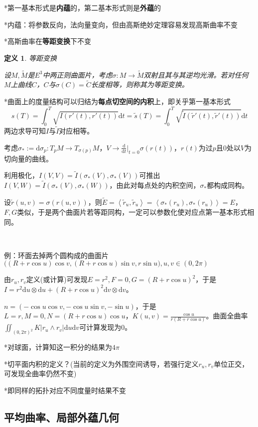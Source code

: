 \documentclass[a4paper,UTF8,fontset=windows]{ctexart}
\newtheorem{dfn}[thm]{定义}
\begin{document}
*第一基本形式是\textbf{内蕴}的，第二基本形式则是\textbf{外蕴}的

*内蕴：将参数反向，法向量变向，但由高斯绝妙定理容易发现高斯曲率不变

*高斯曲率在\textbf{等距变换}下不变

\begin{dfn} 等距变换

设$M,\tilde{M}$是$E^3$中两正则曲面片，考虑$\sigma:M\to\tilde{M}$双射且其与其逆均光滑。若对任何$M$上曲线$C$，$C$与$\sigma(C)=\tilde{C}$长度相等，则称其为等距变换。
\end{dfn}

*曲面上的度量结构可以归结为\textbf{每点切空间的内积}上，即关乎第一基本形式
$$s(T)=\int_0^T\sqrt{I(r'(t),r'(t))}\mathrm{d}t=\tilde{s}(T)=\int_0^T\sqrt{\tilde{I}(\tilde{r}'(t),\tilde{r}'(t))}\mathrm{d}t$$
两边求导可知$I$与$\tilde{I}$对应相等。

考虑$\sigma_*:=\mathrm{d}\sigma_p:T_pM\to T_{\sigma(p)}M$，$V\to \frac{\mathrm{d}}{\mathrm{d}t}\big|_{t=0}\sigma(r(t))$，$r(t)$为过$p$且0处以$V$为切向量的曲线。

利用极化，$I(V,V)=\tilde{I}(\sigma_*(V),\sigma_*(V))$可推出$I(V,W)=\tilde{I}(\sigma_*(V),\sigma_*(W))$，由此对每点处的内积空间，$\sigma_*$都构成同构。

设$\tilde{r}(u,v)=\sigma(r(u,v))$，则$\tilde{E}=\left<\tilde{r}_u,\tilde{r}_u\right>=\left<\sigma_*(r_u),\sigma_*(r_u)\right>=E$，$F,G$类似，于是两个曲面片若等距同构，一定可以参数化使对应点第一基本形式相同。

\

例：环面去掉两个圆构成的曲面片$\big((R+r\cos u)\cos v,(R+r\cos u)\sin v,r\sin u\big),u,v\in(0,2\pi)$

由$r_u,r_v$定义(或计算)可发现$E=r^2,F=0,G=(R+r\cos u)^2$，于是$I=r^2\mathrm{d}u\otimes\mathrm{d}u+(R+r\cos u)^2\mathrm{d}v\otimes\mathrm{d}v$。

$n=(-\cos u\cos v,-\cos u\sin v, -\sin u)$，于是$L=r,M=0,N=(R+r\cos u)\cos u$，$K(u,v)=\frac{\cos u}{r(R+r\cos u)}$。曲面全曲率$\iint_{(0,2\pi)^2}K|r_u\wedge r_v|\mathrm{d}u\mathrm{d}v$可计算发现为0。

*对球面，计算知这一积分的结果为$4\pi$

*切平面内积的定义？(当前的定义为外围空间诱导，若强行定义$r_u,r_v$单位正交，可发现全曲率仍然不变)

*即同样的拓扑对应不同度量时结果不变

\subsection{平均曲率、局部外蕴几何}
\end{document}
